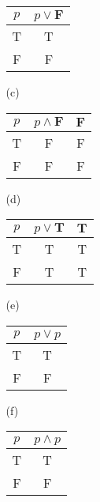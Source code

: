 \documentclass{article}
\begin{document}
\begin{enumerate}
\begin{itemize}
        \newline
        \begin{tabular}{|c|c|}\hline
        $p$ & $p \lor \mathbf{F}$\\\hline
        T & T \\
        F & F \\\hline
        \end{tabular}
        \item[(c)]\hfill
        \vspace{-0.1in}
        \newline
        \begin{tabular}{|c|c|c|}\hline
        $p$ & $p \land \mathbf{F}$ & $\mathbf{F}$\\\hline
        T & F & F \\
        F & F & F \\\hline
        \end{tabular}
        \item[(d)]\hfill
        \vspace{-0.1in}
        \newline
        \begin{tabular}{|c|c|c|}\hline
        $p$ & $p \lor \mathbf{T}$ & $\mathbf{T}$\\\hline
        T & T & T \\
        F & T & T \\\hline
        \end{tabular}
        \item[(e)]\hfill
        \vspace{-0.1in}
        \newline
        \begin{tabular}{|c|c|}\hline
        $p$ & $p \lor p$ \\\hline
        T & T \\
        F & F \\\hline
        \end{tabular}
        \item[(f)]\hfill
        \vspace{-0.1in}
        \newline
        \begin{tabular}{|c|c|}\hline
        $p$ & $p \land p$ \\\hline
        T & T \\
        F & F \\\hline
        \end{tabular}
    \end{itemize}

\end{enumerate}
\end{document}
